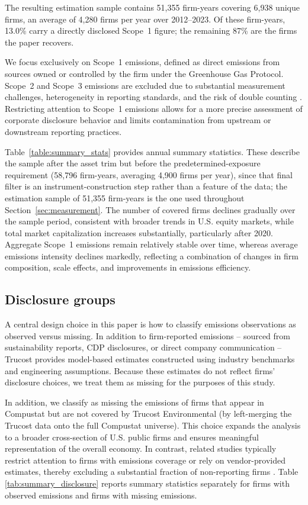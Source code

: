 \documentclass[a4paper,12pt]{article}
\newcommand{\citep}[1]{\parencite{#1}}
\begin{document}
The resulting estimation sample contains 51{,}355 firm-years covering 6{,}938 unique firms, an average of 4{,}280 firms per year over 2012--2023. Of these firm-years, 13.0\% carry a directly disclosed Scope~1 figure; the remaining 87\% are the firms the paper recovers.

We focus exclusively on Scope~1 emissions, defined as direct emissions from sources owned or controlled by the firm under the Greenhouse Gas Protocol. Scope~2 and Scope~3 emissions are excluded due to substantial measurement challenges, heterogeneity in reporting standards, and the risk of double counting \citep{cheema2021decarbonizing}. Restricting attention to Scope~1 emissions allows for a more precise assessment of corporate disclosure behavior and limits contamination from upstream or downstream reporting practices. 

Table~\ref{table:summary_stats} provides annual summary statistics. These describe the sample after the asset trim but before the predetermined-exposure requirement (58{,}796 firm-years, averaging 4{,}900 firms per year), since that final filter is an instrument-construction step rather than a feature of the data; the estimation sample of 51{,}355 firm-years is the one used throughout Section~\ref{sec:measurement}. The number of covered firms declines gradually over the sample period, consistent with broader trends in U.S. equity markets, while total market capitalization increases substantially, particularly after 2020. Aggregate Scope~1 emissions remain relatively stable over time, whereas average emissions intensity declines markedly, reflecting a combination of changes in firm composition, scale effects, and improvements in emissions efficiency.

\subsection{Disclosure groups}

A central design choice in this paper is how to classify emissions observations as observed versus missing. In addition to firm-reported emissions -- sourced from sustainability reports, CDP disclosures, or direct company communication -- Trucost provides model-based estimates constructed using industry benchmarks and engineering assumptions. Because these estimates do not reflect firms’ disclosure choices, we treat them as missing for the purposes of this study. 

In addition, we classify as missing the emissions of firms that appear in Compustat but are not covered by Trucost Environmental (by left-merging the Trucost data onto the full Compustat universe). This choice expands the analysis to a broader cross-section of U.S. public firms and ensures meaningful representation of the overall economy. In contrast, related studies typically restrict attention to firms with emissions coverage or rely on vendor-provided estimates, thereby excluding a substantial fraction of non-reporting firms \citep{olesiewicz2021navigating, duan2025imputation, chen2025green}. Table \ref{tab:summary_disclosure} reports summary statistics separately for firms with observed emissions and firms with missing emissions.
\end{document}
